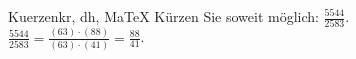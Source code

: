 \begin{MAufgabe}{Kuerzen}{kr, dh, MaTeX}
K\"urzen Sie soweit m\"oglich: $\frac{5544}{2583}$.\\ 
\ifLsg\MLoesung
\quad $\frac{5544}{2583}=\frac{(63)\cdot(88)}{(63)\cdot(41)}=\frac{88}{41}$.\else\relax\fi
 \end{MAufgabe}